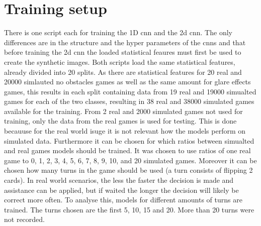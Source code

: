 \newpage

\section{Training setup}
\label{training_setup}
There is one script each for training the 1D cnn and the 2d cnn. The only differences are in the structure and the hyper parameters of the cnns and that before training the 2d cnn the loaded statistical feaures must first be used to create the synthetic images. Both scripts load the same statistical features, already divided into 20 splits. As there are statistical features for 20 real and 20000 simlauted no obstacles games as well as the same amount for glare effects games, this results in each split containing data from 19 real and 19000 simualted games for each of the two classes, resulting in 38 real and 38000 simulated games available for the training. From 2 real and 2000 simulated games not used for training, only the data from the real games is used for testing.  This is done becauuse for the real world isuge it is not relevant how the models perform on simulated data. Furthermore it can be chosen for which ratios between simualted and real games models should be trained. It was chosen to use ratios of one real game to 0, 1, 2, 3, 4, 5, 6, 7, 8, 9, 10, and 20 simulated games. Moreover it can be chosen how many turns in the game should be used (a turn consists of flipping 2 cards). In real world scenarios, the less the faster the decision is made and assistance can be applied, but if waited the longer the decision will likely be correct more often. To analyse this, models for different amounts of turns are trained. The turns chosen are the first 5, 10, 15 and 20. More than 20 turns were not recorded. 




